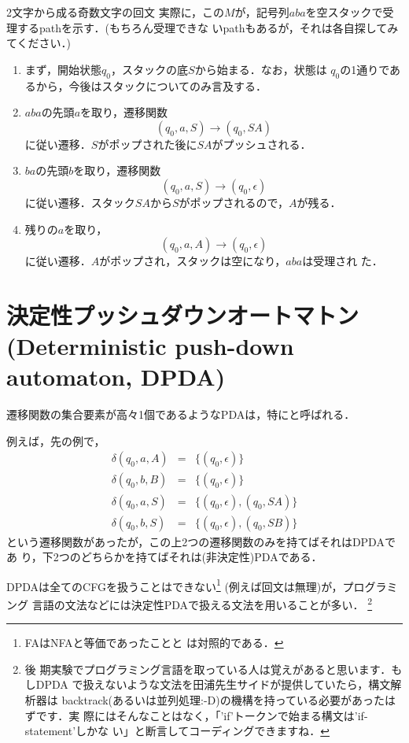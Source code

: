 \begin{myexample}{2文字から成る奇数文字の回文}
 実際に，この$M$が，記号列$aba$を空スタックで受理するpathを示す．(もちろん受理できな
 いpathもあるが，それは各自探してみてください．)

 \begin{enumerate}
  \item まず，開始状態$q_0$，スタックの底$S$から始まる．なお，状態は
        $q_0$の1通りであるから，今後はスタックについてのみ言及する．
  \item $aba$の先頭$a$を取り，遷移関数
        \[
        (q_0, a, S) \rightarrow (q_0, SA)
        \]
        に従い遷移．$S$がポップされた後に$SA$がプッシュされる．
  \item $ba$の先頭$b$を取り，遷移関数
        \[
        (q_0, a, S) \rightarrow (q_0, \epsilon)
        \]
        に従い遷移．スタック$SA$から$S$がポップされるので，$A$が残る．
  \item 残りの$a$を取り，
        \[
         (q_0, a, A) \rightarrow (q_0, \epsilon)
        \]
        に従い遷移．$A$がポップされ，スタックは空になり，$aba$は受理され
        た．
 \end{enumerate}
\end{myexample}

\section{決定性プッシュダウンオートマトン(Deterministic push-down
 automaton, DPDA)} \label{sec:04dpda}
遷移関数の集合要素が高々1個であるようなPDAは，特にと呼ばれる．

例えば，先の例で，
 \begin{eqnarray*}
  \delta (q_0, a, A) &=& \{(q_0, \epsilon)\} \\
  \delta (q_0, b, B) &=& \{(q_0, \epsilon)\} \\
  \delta (q_0, a, S) &=& \{(q_0, \epsilon), (q_0, SA )\} \\
  \delta (q_0, b, S) &=& \{(q_0, \epsilon), (q_0, SB)\}
 \end{eqnarray*}
という遷移関数があったが，この上2つの遷移関数のみを持てばそれはDPDAであ
り，下2つのどちらかを持てばそれは(非決定性)PDAである．

DPDAは全てのCFGを扱うことはできない\footnote{FAはNFAと等価であったことと
は対照的である．}
(例えば回文は無理)が，プログラミング
言語の文法などには決定性PDAで扱える文法を用いることが多い． \footnote{後
期実験でプログラミング言語を取っている人は覚えがあると思います．もしDPDA
で扱えないような文法を田浦先生サイドが提供していたら，構文解析器は
backtrack(あるいは並列処理:-D)の機構を持っている必要があったはずです．実
際にはそんなことはなく，「'if'トークンで始まる構文は'if-statement'しかな
い」と断言してコーディングできますね．}
